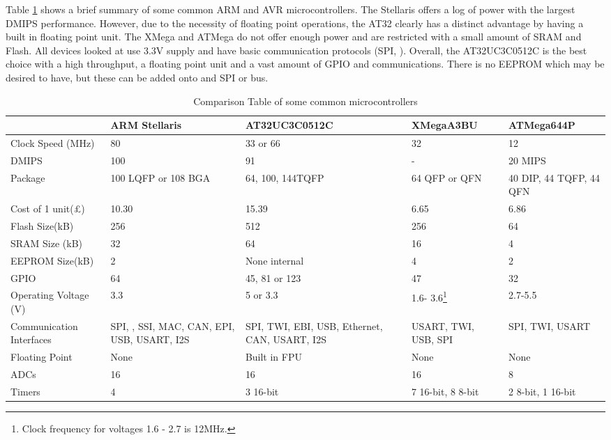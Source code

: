 Table \ref{tab:uCComp} shows a brief summary of some common ARM and AVR microcontrollers. The Stellaris offers a log of  power with the largest DMIPS performance. However, due to the necessity of floating point operations, the AT32 clearly has a distinct advantage by having a built in floating point unit. The XMega and ATMega do not offer enough power and are restricted with a small amount of SRAM and Flash. All devices looked at use 3.3V supply and have basic communication protocols (SPI, \itc). Overall, the AT32UC3C0512C is the best choice with a high throughput, a floating point unit and a vast amount of GPIO and communications. There is no EEPROM which may be desired to have, but these can be added onto and SPI or \itc bus. 


\begin{table}
\centering
\begin{tabular}{|p{3.5cm}|p{2.4cm}|p{2.9cm}|p{2.3cm}|p{2.4cm}|}\hline
						& 	ARM Stellaris		&	AT32UC3C0512C 		&	XMegaA3BU	&	ATMega644P 	\\	\hline
Clock Speed	(MHz)		&	80					&	33 or 66			&	32			&	12			\\
DMIPS					&	100					&	91					&	-			&	20 MIPS		\\
Package					&	100 LQFP or 108 BGA	&	64, 100, 144TQFP	&	64 QFP or QFN & 40 DIP, 44 TQFP, 44 QFN \\
Cost of 1 unit(\pounds)	&	10.30				& 15.39 &	6.65	 & 6.86\\
Flash Size(kB)			&	256					&	512					&	256			&	64 \\
SRAM Size (kB)			&	32					&	64					&	16			&	4	\\
EEPROM Size(kB)			&	2					&	None internal		&	4			&	2 	\\
GPIO					&	64					& 	45, 81 or 123		&	47			& 	32	\\
Operating Voltage (V)	&	3.3					& 	5	or 3.3			& 	1.6- 3.6\footnote{Clock frequency for voltages 1.6 - 2.7 is 12MHz.}		& 	2.7-5.5	\\
Communication Interfaces &	SPI, \itc, SSI, MAC, CAN, EPI, USB, USART, I2S	& SPI, TWI, EBI, USB, Ethernet, CAN, USART, I2S	&	USART, TWI, USB, SPI 		&	SPI, TWI, USART \\
Floating Point			&	None				&	Built in FPU		&	None		&	None		\\
ADCs					&	16					&	16					&	16			&	8			\\
Timers					&	4					&	3 16-bit			& 7 16-bit, 8 8-bit & 2 8-bit, 1 16-bit \\
\hline
\end{tabular}
\caption{Comparison Table of some common microcontrollers}
\label{tab:uCComp}
\end{table}

